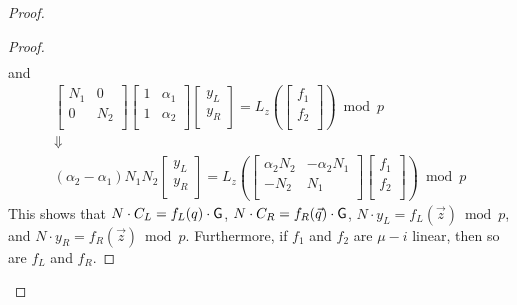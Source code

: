 \begin{proof}
\begin{proof}
\begin{equation*}
\begin{array}{c}
\end{array} 
\end{equation*}
and
\begin{equation*}
\begin{array}{c}
\begin{bmatrix}
N_1 & 0 \\
0 & N_2 \\
\end{bmatrix} 
\begin{bmatrix}
1 & \alpha_1 \\
1 & \alpha_2 \\
\end{bmatrix} 
\begin{bmatrix}
y_L \\
y_R \\
\end{bmatrix} 
= 
L_z \left(
\begin{bmatrix}
f_1 \\
f_2\\
\end{bmatrix}
\right) \bmod p\\
\Downarrow\\
(\alpha_2 - \alpha_1) N_1 N_2 
\begin{bmatrix}
y_L \\
y_R \\
\end{bmatrix}
= 
L_z \left(
\begin{bmatrix}
\alpha_2 N_2 & -\alpha_2 N_1 \\
-N_2 & N_1 \\
\end{bmatrix}
\begin{bmatrix}
f_1 \\
f_2 \\
\end{bmatrix}
\right)
\bmod p
\end{array}
\end{equation*} 
This shows that $N \cdot C_L = f_L(q) \cdot \gr{G}$, $N \cdot C_R = f_R(\vec{q}) \cdot \gr{G}$, $N \cdot y_L = f_L(\vec{z}) \bmod p$, and $N \cdot y_R = f_R(\vec{z}) \bmod p$. Furthermore, if $f_1$ and $f_2$ are $\mu-i$ linear, then so are $f_L$ and $f_R$. 



\end{proof}
\end{proof}
